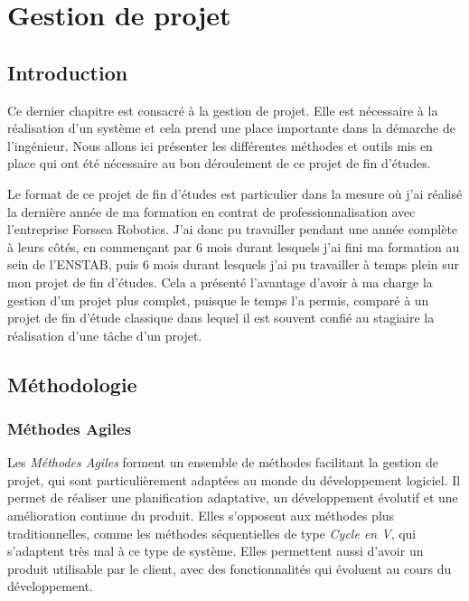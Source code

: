 \chapter{Gestion de projet}
\label{chapter:projet}
	
	\section{Introduction}

		Ce dernier chapitre est consacré à la gestion de projet. Elle est nécessaire à la réalisation d'un système et cela prend une place importante dans la démarche de l'ingénieur. Nous allons ici présenter les différentes méthodes et outils mis en place qui ont été nécessaire au bon déroulement de ce projet de fin d'études.

		Le format de ce projet de fin d'études est particulier dans la mesure où j'ai réalisé la dernière année de ma formation en contrat de professionnalisation avec l'entreprise Forssea Robotics. J'ai donc pu travailler pendant une année complète à leurs côtés, en commençant par 6 mois durant lesquels j'ai fini ma formation au sein de l'\gls{ENSTAB}, puis 6 mois durant lesquels j'ai pu travailler à temps plein sur mon projet de fin d'études. Cela a présenté l'avantage d'avoir à ma charge la gestion d'un projet plus complet, puisque le temps l'a permis, comparé à un projet de fin d'étude classique dans lequel il est souvent confié au stagiaire la réalisation d'une tâche d'un projet.

	\section{Méthodologie}

		\subsection{Méthodes Agiles}
			Les \textit{Méthodes Agiles} forment un ensemble de méthodes facilitant la gestion de projet, qui sont particulièrement adaptées au monde du développement logiciel. Il permet de réaliser une planification adaptative, un développement évolutif et une amélioration continue du produit. Elles s'opposent aux méthodes plus traditionnelles, comme les méthodes séquentielles de type \textit{Cycle en V}, qui s'adaptent très mal à ce type de système. Elles permettent aussi d'avoir un produit utilisable par le client, avec des fonctionnalités qui évoluent au cours du développement.

